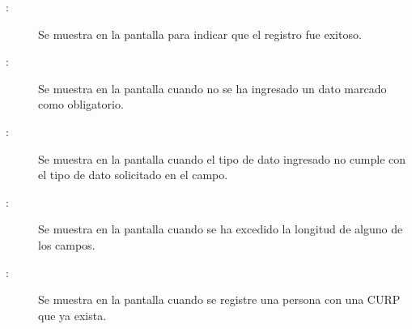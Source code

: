 \begin{description}
	\item[:] Se muestra en la pantalla  para indicar que el registro fue exitoso.
	\item[:] Se muestra en la pantalla  cuando no se ha ingresado un dato marcado como obligatorio.
	\item[:] Se muestra en la pantalla  cuando el tipo de dato ingresado no cumple con el tipo de dato solicitado en el campo.
	\item[:] Se muestra en la pantalla  cuando se ha excedido la longitud de alguno de los campos.
	\item[:] Se muestra en la pantalla  cuando se registre una persona con una CURP que ya exista.
\end{description}
